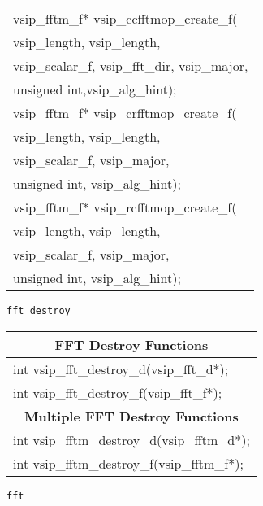 {\begin{tabular}[H]{l}
vsip\_fftm\_f* vsip\_ccfftmop\_create\_f(\\*\hspace{.7cm}vsip\_length, vsip\_length,\\*\hspace{.7cm}vsip\_scalar\_f, vsip\_fft\_dir, vsip\_major,\\*\hspace{.7cm} unsigned int,vsip\_alg\_hint);\\
vsip\_fftm\_f* vsip\_crfftmop\_create\_f(\\*\hspace{.7cm}vsip\_length, vsip\_length,\\*\hspace{.7cm}vsip\_scalar\_f, vsip\_major,\\*\hspace{.7cm} unsigned int, vsip\_alg\_hint);\\
vsip\_fftm\_f* vsip\_rcfftmop\_create\_f(\\*\hspace{.7cm}vsip\_length, vsip\_length,\\*\hspace{.7cm}vsip\_scalar\_f, vsip\_major,\\*\hspace{.7cm} unsigned int, vsip\_alg\_hint);\\ \hline
\end{tabular}
}
\clearpage
\hspace*{.8cm} \vspace*{.1cm} \texttt{fft\_destroy}
\newline \hspace*{1.1cm} {
\ttfamily
\begin{tabular}[H]{l}\hline
\hline \multicolumn{1}{c}{\rmfamily \bfseries FFT Destroy Functions}\\ \hline
int vsip\_fft\_destroy\_d(vsip\_fft\_d*);\\
int vsip\_fft\_destroy\_f(vsip\_fft\_f*);\\
\hline \multicolumn{1}{c}{\rmfamily \bfseries Multiple FFT Destroy Functions}\\ \hline
int vsip\_fftm\_destroy\_d(vsip\_fftm\_d*);\\
int vsip\_fftm\_destroy\_f(vsip\_fftm\_f*);\\ \hline
\end{tabular}
}\vspace{.1cm}
\newline \hspace*{.8cm} \vspace*{.1cm} \texttt{fft}
